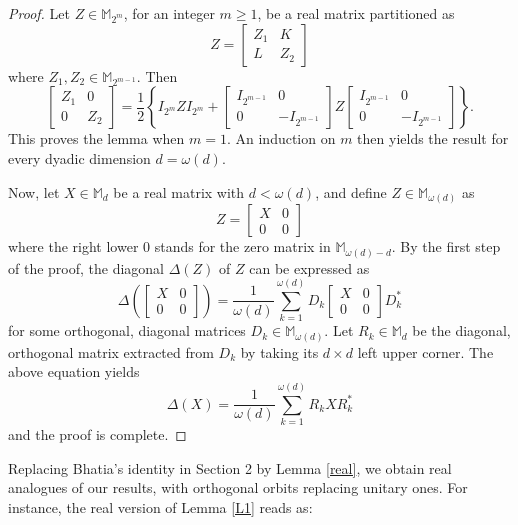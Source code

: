 \documentclass[12pt,reqno]{article}
\theoremstyle{definition}
\theoremstyle{remark}
\numberwithin{equation}{section}
\def\bM{\mathbb{M}}
\begin{document}
\vskip 5pt
\begin{proof}  Let $Z\in\bM_{2^m}$, for an integer $m\ge 1$, be a real matrix partitioned as
$$
Z=\begin{bmatrix} Z_1&K \\ L&Z_2
\end{bmatrix}
$$
where $Z_1,Z_2\in\bM_{2^{m-1}}$. Then
$$
\begin{bmatrix} Z_1&0 \\ 0&Z_2
\end{bmatrix}=
 \frac{1}{2}\left\{ I_{2^m} Z I_{2^m} + \begin{bmatrix} I_{2^{m-1}}&0 \\ 0&-I_{2^{m-1}}\end{bmatrix} Z
\begin{bmatrix} I_{2^{m-1}}&0 \\ 0&-I_{2^{m-1}}\end{bmatrix}
\right\}.
$$
This proves the lemma when $m=1$. An induction on $m$ then yields the result for every dyadic dimension  $d=\omega(d)$.

Now, let $X\in\bM_d$ be a real matrix with $d<\omega(d)$, and define $Z\in\bM_{\omega(d)}$ as
$$
Z=\begin{bmatrix} X&0 \\ 0&0 \end{bmatrix}
$$
where the right lower $0$ stands for the zero matrix in $\bM_{\omega(d)-d}$. By the first step of the proof, the diagonal $\Delta(Z)$ of $Z$ can be expressed as
$$
\Delta\left(\begin{bmatrix} X&0 \\ 0&0 \end{bmatrix}\right)=
\frac{1}{\omega(d)} \sum_{k=1}^{\omega(d)} D_k\begin{bmatrix} X&0 \\ 0&0 \end{bmatrix}D_k^*
$$
for some orthogonal, diagonal matrices $D_k\in\bM_{\omega(d)}$. Let $R_k\in\bM_d$ be the diagonal, orthogonal matrix extracted from $D_k$ by taking its $d\times d$ left upper corner. The above equation yields
$$
\Delta(X)=
\frac{1}{\omega(d)} \sum_{k=1}^{\omega(d)} R_kXR_k^*
$$
and the proof is complete.
\end{proof}

\vskip 5pt
Replacing Bhatia's identity in Section 2 by Lemma \ref{real}, we obtain real analogues of our results, with orthogonal orbits replacing unitary ones. For instance, the real version of Lemma \ref{L1} reads as:
\end{document}

